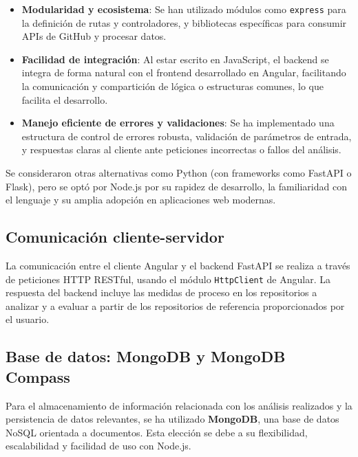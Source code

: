 \begin{itemize}  
  \item \textbf{Modularidad y ecosistema}: Se han utilizado módulos como \texttt{express} para la definición de rutas y controladores, y bibliotecas específicas para consumir APIs de GitHub y procesar datos.
  
  \item \textbf{Facilidad de integración}: Al estar escrito en JavaScript, el backend se integra de forma natural con el frontend desarrollado en Angular, facilitando la comunicación y compartición de lógica o estructuras comunes, lo que facilita el desarrollo.
  
  \item \textbf{Manejo eficiente de errores y validaciones}: Se ha implementado una estructura de control de errores robusta, validación de parámetros de entrada, y respuestas claras al cliente ante peticiones incorrectas o fallos del análisis.
\end{itemize}

Se consideraron otras alternativas como Python (con frameworks como FastAPI o Flask), pero se optó por Node.js por su rapidez de desarrollo, la familiaridad con el lenguaje y su amplia adopción en aplicaciones web modernas.

\subsection{Comunicación cliente-servidor}

La comunicación entre el cliente Angular y el backend FastAPI se realiza a través de peticiones HTTP RESTful, usando el módulo \texttt{HttpClient} de Angular. La respuesta del backend incluye las medidas de proceso en los repositorios a analizar y a evaluar a partir de los repositorios de referencia proporcionados por el usuario.

\subsection{Base de datos: MongoDB y MongoDB Compass}

Para el almacenamiento de información relacionada con los análisis realizados y la persistencia de datos relevantes, se ha utilizado \textbf{MongoDB}, una base de datos NoSQL orientada a documentos. Esta elección se debe a su flexibilidad, escalabilidad y facilidad de uso con Node.js.

